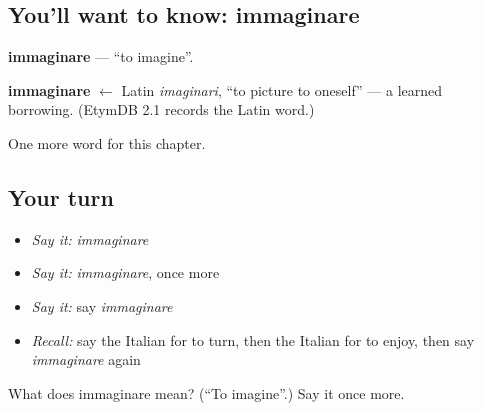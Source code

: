 \subsection*{You'll want to know: immaginare}
\textbf{immaginare} — \textquotedblleft{}to imagine\textquotedblright{}.

\begin{cousinweb}
\textbf{immaginare} $\leftarrow$ Latin \emph{imaginari}, \textquotedblleft{}to picture to oneself\textquotedblright{} — a learned borrowing. (EtymDB 2.1 records the Latin word.)
\end{cousinweb}

\begin{grammarlens}[title={What you've built}]
One more word for this chapter.
\end{grammarlens}

\subsection*{Your turn}
\begin{itemize}
\raggedright
  \item \emph{Say it:} \emph{immaginare}
  \item \emph{Say it:} \emph{immaginare}, once more
  \item \emph{Say it:} say \emph{immaginare}
  \item \emph{Recall:} say the Italian for to turn, then the Italian for to enjoy, then say \emph{immaginare} again
\end{itemize}

\begin{tcolorbox}[breakable,colback=teal!4,colframe=teal!35!black,title={Before you move on}]
What does immaginare mean? (\textquotedblleft{}To imagine\textquotedblright{}.) Say it once more.
\end{tcolorbox}
